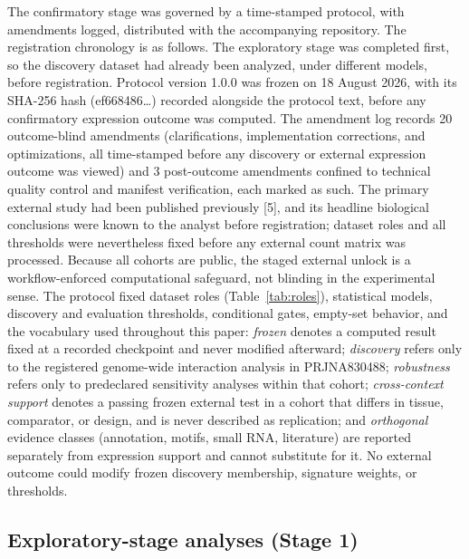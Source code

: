 \documentclass[referee,pdflatex,sn-basic,Numbered]{sn-jnl}
\begin{document}
The confirmatory stage was governed by a time-stamped protocol, with amendments logged, distributed with the accompanying repository. The registration chronology is as follows. The exploratory stage was completed first, so the discovery dataset had already been analyzed, under different models, before registration. Protocol version 1.0.0 was frozen on 18 August 2026, with its SHA-256 hash (ef668486\ldots) recorded alongside the protocol text, before any confirmatory expression outcome was computed. The amendment log records 20 outcome-blind amendments (clarifications, implementation corrections, and optimizations, all time-stamped before any discovery or external expression outcome was viewed) and 3 post-outcome amendments confined to technical quality control and manifest verification, each marked as such. The primary external study had been published previously [5], and its headline biological conclusions were known to the analyst before registration; dataset roles and all thresholds were nevertheless fixed before any external count matrix was processed. Because all cohorts are public, the staged external unlock is a workflow-enforced computational safeguard, not blinding in the experimental sense. The protocol fixed dataset roles (Table~\ref{tab:roles}), statistical models, discovery and evaluation thresholds, conditional gates, empty-set behavior, and the vocabulary used throughout this paper: \emph{frozen} denotes a computed result fixed at a recorded checkpoint and never modified afterward; \emph{discovery} refers only to the registered genome-wide interaction analysis in PRJNA830488; \emph{robustness} refers only to predeclared sensitivity analyses within that cohort; \emph{cross-context support} denotes a passing frozen external test in a cohort that differs in tissue, comparator, or design, and is never described as replication; and \emph{orthogonal} evidence classes (annotation, motifs, small RNA, literature) are reported separately from expression support and cannot substitute for it. No external outcome could modify frozen discovery membership, signature weights, or thresholds.

\subsection{Exploratory-stage analyses (Stage 1)}
\end{document}
